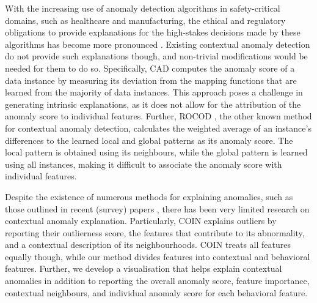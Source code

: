 \documentclass[pdflatex,sn-basic]{sn-jnl}%
\theoremstyle{thmstyleone}%
\theoremstyle{thmstyletwo}%
\theoremstyle{thmstylethree}%
\begin{document}
With the increasing use of anomaly detection algorithms in safety-critical domains, such as healthcare and manufacturing, the ethical and regulatory obligations to provide explanations for the high-stakes decisions made by these algorithms has become more pronounced \citep{li2022survey}. Existing contextual anomaly detection do not provide such explanations though, and non-trivial modifications would be needed for them to do so. Specifically, CAD \citep{song2007conditional} computes the anomaly score of a data instance by measuring its deviation from the mapping functions that are learned from the majority of data instances. This approach poses a challenge in generating intrinsic explanations, as it does not allow for the attribution of the anomaly score to individual features. Further, ROCOD \citep{liang2016robust}, the other known method for contextual anomaly detection, calculates the weighted average of an instance’s differences to the learned local and global patterns as its anomaly score. The local pattern is obtained using its neighbours, while the global pattern is learned using all instances, making it difficult to associate the anomaly score with individual features.

Despite the existence of numerous methods for explaining anomalies, such as those outlined in recent (survey) papers \citep{panjei2022survey,li2022survey,xu2021beyond}, there has been very limited research on contextual anomaly explanation. Particularly, COIN \citep{liu2018contextual} explains outliers by reporting their outlierness score, the features that contribute to its abnormality, and a contextual description of its neighbourhoods. COIN treats all features equally though, while our method divides features into contextual and behavioral features. Further, we develop a visualisation that helps explain contextual anomalies in addition to reporting the overall anomaly score, feature importance, contextual neighbours, and individual anomaly score for each behavioral feature.
\end{document}
